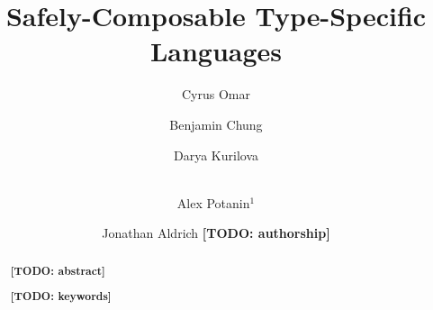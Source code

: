 \documentclass[runningheads,a4paper]{llncs}
\newcommand{\keywords}[1]{\par\addvspace\baselineskip
\noindent\keywordname\enspace\ignorespaces#1}
\newcommand{\todo}[1]{\textbf{[TODO: #1]}}
\begin{document}
\title{Safely-Composable Type-Specific Languages}

\author{Cyrus Omar \and Benjamin Chung \and Darya Kurilova \and\\
Alex Potanin$^{1}$ \and Jonathan Aldrich \todo{authorship}}

\maketitle


\begin{abstract}
\todo{abstract}
%
\keywords{\todo{keywords}}
\end{abstract}












\end{document}
